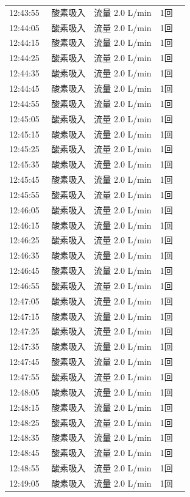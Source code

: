 \documentclass[UTF8,10pt,a4paper,fontset=fandol]{ctexart}
\begin{document}
\begin{minipage}[t]{0.48\linewidth}
\begin{tabular}{@{}p{0.22\linewidth}p{0.72\linewidth}@{}}
12:43:55 & 酸素吸入　流量 2.0 L/min　1回\\
12:44:05 & 酸素吸入　流量 2.0 L/min　1回\\
12:44:15 & 酸素吸入　流量 2.0 L/min　1回\\
12:44:25 & 酸素吸入　流量 2.0 L/min　1回\\
12:44:35 & 酸素吸入　流量 2.0 L/min　1回\\
12:44:45 & 酸素吸入　流量 2.0 L/min　1回\\
12:44:55 & 酸素吸入　流量 2.0 L/min　1回\\
12:45:05 & 酸素吸入　流量 2.0 L/min　1回\\
12:45:15 & 酸素吸入　流量 2.0 L/min　1回\\
12:45:25 & 酸素吸入　流量 2.0 L/min　1回\\
12:45:35 & 酸素吸入　流量 2.0 L/min　1回\\
12:45:45 & 酸素吸入　流量 2.0 L/min　1回\\
12:45:55 & 酸素吸入　流量 2.0 L/min　1回\\
12:46:05 & 酸素吸入　流量 2.0 L/min　1回\\
12:46:15 & 酸素吸入　流量 2.0 L/min　1回\\
12:46:25 & 酸素吸入　流量 2.0 L/min　1回\\
12:46:35 & 酸素吸入　流量 2.0 L/min　1回\\
12:46:45 & 酸素吸入　流量 2.0 L/min　1回\\
12:46:55 & 酸素吸入　流量 2.0 L/min　1回\\
12:47:05 & 酸素吸入　流量 2.0 L/min　1回\\
12:47:15 & 酸素吸入　流量 2.0 L/min　1回\\
12:47:25 & 酸素吸入　流量 2.0 L/min　1回\\
12:47:35 & 酸素吸入　流量 2.0 L/min　1回\\
12:47:45 & 酸素吸入　流量 2.0 L/min　1回\\
12:47:55 & 酸素吸入　流量 2.0 L/min　1回\\
12:48:05 & 酸素吸入　流量 2.0 L/min　1回\\
12:48:15 & 酸素吸入　流量 2.0 L/min　1回\\
12:48:25 & 酸素吸入　流量 2.0 L/min　1回\\
12:48:35 & 酸素吸入　流量 2.0 L/min　1回\\
12:48:45 & 酸素吸入　流量 2.0 L/min　1回\\
12:48:55 & 酸素吸入　流量 2.0 L/min　1回\\
12:49:05 & 酸素吸入　流量 2.0 L/min　1回\\

\end{tabular}
\end{minipage}
\end{document}
